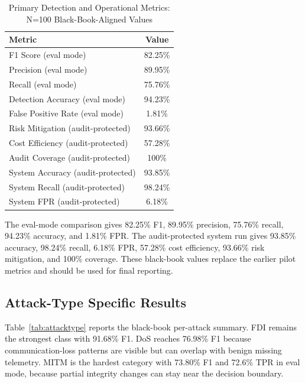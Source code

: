 \documentclass[conference,a4paper]{IEEEtran}
\begin{document}
\begin{table}[htbp]
\caption{Primary Detection and Operational Metrics: N=100 Black-Book-Aligned Values}
\begin{center}
\begin{tabular}{|l|c|}
\hline
\textbf{Metric} & \textbf{Value} \\
\hline
F1 Score (eval mode) & 82.25\% \\
\hline
Precision (eval mode) & 89.95\% \\
\hline
Recall (eval mode) & 75.76\% \\
\hline
Detection Accuracy (eval mode) & 94.23\% \\
\hline
False Positive Rate (eval mode) & 1.81\% \\
\hline
Risk Mitigation (audit-protected) & 93.66\% \\
\hline
Cost Efficiency (audit-protected) & 57.28\% \\
\hline
Audit Coverage (audit-protected) & 100\% \\
\hline
System Accuracy (audit-protected) & 93.85\% \\
\hline
System Recall (audit-protected) & 98.24\% \\
\hline
System FPR (audit-protected) & 6.18\% \\
\hline
\end{tabular}
\label{tab:primary}
\end{center}
\end{table}

The eval-mode comparison gives 82.25\% F1, 89.95\% precision, 75.76\% recall, 94.23\% accuracy, and 1.81\% FPR. The audit-protected system run gives 93.85\% accuracy, 98.24\% recall, 6.18\% FPR, 57.28\% cost efficiency, 93.66\% risk mitigation, and 100\% coverage. These black-book values replace the earlier pilot metrics and should be used for final reporting.

\subsection{Attack-Type Specific Results}

Table~\ref{tab:attacktype} reports the black-book per-attack summary. FDI remains the strongest class with 91.68\% F1. DoS reaches 76.98\% F1 because communication-loss patterns are visible but can overlap with benign missing telemetry. MITM is the hardest category with 73.80\% F1 and 72.6\% TPR in eval mode, because partial integrity changes can stay near the decision boundary.
\end{document}
